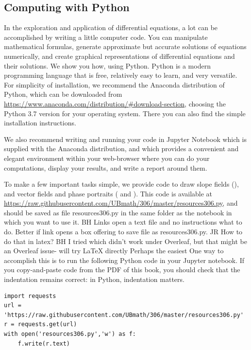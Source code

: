\documentclass[12pt]{book}
\begin{document}

\subsection {Computing with Python}

In the exploration and application of differential equations, a lot can be accomplished by writing a little computer code.
You can manipulate mathematical formulas, 
generate approximate but accurate solutions of equations numerically, and 
create graphical representations of differential equations and their solutions.
We show you how, using Python. Python is a modern programming language that is free, relatively easy to learn,
and very versatile. For simplicity of installation, we recommend the Anaconda distribution of Python, 
which can be downloaded from 
\url{https://www.anaconda.com/distribution/\#download-section}, 
choosing the Python 3.7 version for your operating system.
There you can also find the simple installation instructions. 

We also recommend writing and
running your code in Jupyter Notebook which is supplied with the Anaconda distribution, and which 
provides a convenient and elegant environment within your web-browser 
where you can do your computations, display your results, and write a report around them.

To make a few important tasks simple, we provide code to draw slope fields (), and
vector fields and phase portraits ( and ). 
This code is available at 
\newline
\url{https://raw.githubusercontent.com/UBmath/306/master/resources306.py}, 
and should be saved 
{\color{blue} as file resources306.py }
in the same folder as the notebook in which you want to use it.
{\color{teal}BH Links open a text file and no instructions what to do.
Better if link opens a box offering to save file as resources306.py. JR How to do that in latex?
BH I tried  which
didn't work under Overleaf, but that might be
an Overleaf issue- will try LaTeX directly}
{\color{red}Perhaps the easiest}
{\color{blue}One} way to accomplish this is to run the following Python code in your Jupyter notebook.
If you copy-and-paste code from the PDF of this book, you should check that the indentation remains correct: 
in Python, indentation matters.


\begin{small}
\begin{verbatim}
import requests
url = 'https://raw.githubusercontent.com/UBmath/306/master/resources306.py'
r = requests.get(url)
with open('resources306.py','w') as f:
    f.write(r.text)
\end{verbatim}
\end{small}
\end{document}
